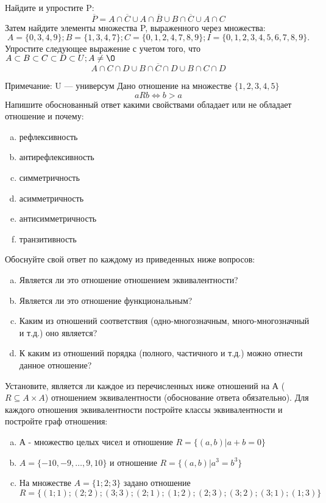 \documentclass[10pt]{exam}
\begin{document}
\begin{questions}
\question
Найдите и упростите P:
\begin{equation*}
\overline{P} = A \cap \overline{C} \cup A \cap \overline{B} \cup B \cap \overline{C} \cup A \cap C
\end{equation*}
Затем найдите элементы множества P, выраженного через множества:
\begin{equation*}
A = \{0, 3, 4, 9\}; 
B = \{1, 3, 4, 7\};
C = \{0, 1, 2, 4, 7, 8, 9\};
I = \{0, 1, 2, 3, 4, 5, 6, 7, 8, 9\}.
\end{equation*}\question
Упростите следующее выражение с учетом того, что $A\subset B \subset C \subset D \subset U; A \neq \O$
\begin{equation*}
A \cap C  \cap D \cup B \cap \overline{C} \cap D \cup B \cap C \cap D
\end{equation*}

Примечание: U — универсум\question
Дано отношение на множестве $\{1, 2, 3, 4, 5\}$ 
\begin{equation*}
aRb \iff b > a
\end{equation*}
Напишите обоснованный ответ какими свойствами обладает или не обладает отношение и почему:   
\begin{enumerate} [a)]\setcounter{enumi}{0}
\item рефлексивность
\item антирефлексивность
\item симметричность
\item асимметричность
\item антисимметричность
\item транзитивность
\end{enumerate}

Обоснуйте свой ответ по каждому из приведенных ниже вопросов:
\begin{enumerate} [a)]\setcounter{enumi}{0}
    \item Является ли это отношение отношением эквивалентности?
    \item Является ли это отношение функциональным?
    \item Каким из отношений соответствия (одно-многозначным, много-многозначный и т.д.) оно является?
    \item К каким из отношений порядка (полного, частичного и т.д.) можно отнести данное отношение?
\end{enumerate}

\question
Установите, является ли каждое из перечисленных ниже отношений на А ($R \subseteq A \times A$) отношением эквивалентности (обоснование ответа обязательно). Для каждого отношения эквивалентности 
постройте классы эквивалентности и постройте граф отношения:
\begin{enumerate}[a)]\setcounter{enumi}{0}
\item А - множество целых чисел и отношение $R = \{(a,b)|a + b = 0\}$
\item $A = \{-10, -9, …, 9, 10\}$ и отношение $R = \{(a,b)|a^{3} = b^{3}\}$
\item На множестве $A = \{1; 2; 3\}$ задано отношение $R = \{(1; 1); (2; 2); (3; 3); (2; 1); (1; 2); (2; 3); (3; 2); (3; 1); (1; 3)\}$


\end{enumerate}
\end{questions}
\end{document}

